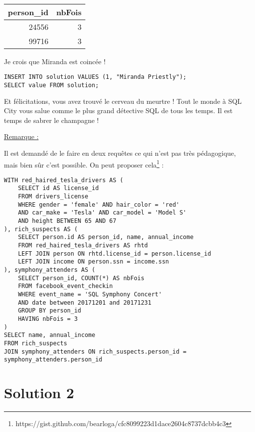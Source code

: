 \begin{table}[!htp]
\centering
{\tt
\begin{tabular}{rr}
person\_id& nbFois \\ \hline
24556& 3 \\
99716& 3 \\
\end{tabular}
}
\end{table}

Je crois que Miranda est coincée !
\begin{verbatim}
INSERT INTO solution VALUES (1, "Miranda Priestly");
SELECT value FROM solution;
\end{verbatim}
Et félicitations, vous avez trouvé le cerveau du meurtre ! Tout le monde à SQL City vous salue comme le plus grand détective SQL de tous les temps. Il est temps de sabrer le champagne !






\underline{Remarque :}

Il est demandé de le faire en deux requêtes ce qui n'est pas très pédagogique, mais bien sûr c'est possible. On peut proposer cela\footnote{https://gist.github.com/bearloga/cfc8099223d1dace2604c8737dcbb4c3} :
\begin{verbatim}
WITH red_haired_tesla_drivers AS (
    SELECT id AS license_id
    FROM drivers_license
    WHERE gender = 'female' AND hair_color = 'red'
    AND car_make = 'Tesla' AND car_model = 'Model S'
    AND height BETWEEN 65 AND 67 
), rich_suspects AS (
    SELECT person.id AS person_id, name, annual_income
    FROM red_haired_tesla_drivers AS rhtd
    LEFT JOIN person ON rhtd.license_id = person.license_id
    LEFT JOIN income ON person.ssn = income.ssn
), symphony_attenders AS (
    SELECT person_id, COUNT(*) AS nbFois
    FROM facebook_event_checkin
    WHERE event_name = 'SQL Symphony Concert'
	AND date between 20171201 and 20171231 
    GROUP BY person_id
    HAVING nbFois = 3 
)
SELECT name, annual_income
FROM rich_suspects
JOIN symphony_attenders ON rich_suspects.person_id = symphony_attenders.person_id
\end{verbatim}




\section{Solution 2}

\question{}
 
